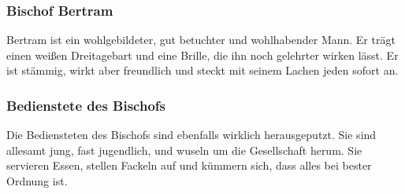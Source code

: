 \subsubsection*{Bischof Bertram}
\label{Bertram}

Bertram ist ein wohlgebildeter, gut betuchter und wohlhabender Mann. Er trägt einen weißen Dreitagebart und eine Brille, die ihn noch gelehrter wirken lässt. Er ist stämmig, wirkt aber freundlich und steckt mit seinem Lachen jeden sofort an.

\subsubsection*{Bedienstete des Bischofs}
\label{Bischofdiener}

Die Bediensteten des Bischofs sind ebenfalls wirklich herausgeputzt. Sie sind allesamt jung, fast jugendlich, und wuseln um die Gesellschaft herum. Sie servieren Essen, stellen Fackeln auf und kümmern sich, dass alles bei bester Ordnung ist.
